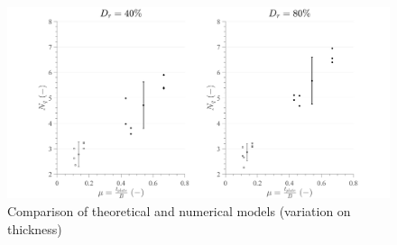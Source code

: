 \documentclass[a4paper, nobind]{templates/ociamthesis}
\begin{document}
\begin{figure}[H]
\includegraphics[width=1\linewidth]{myfigureeeeee/comparison_mu_3} \caption{Comparison of theoretical and numerical models (variation on thickness)}\label{fig:unnamed-chunk-52}
\end{figure}

\startappendices
\end{document}
